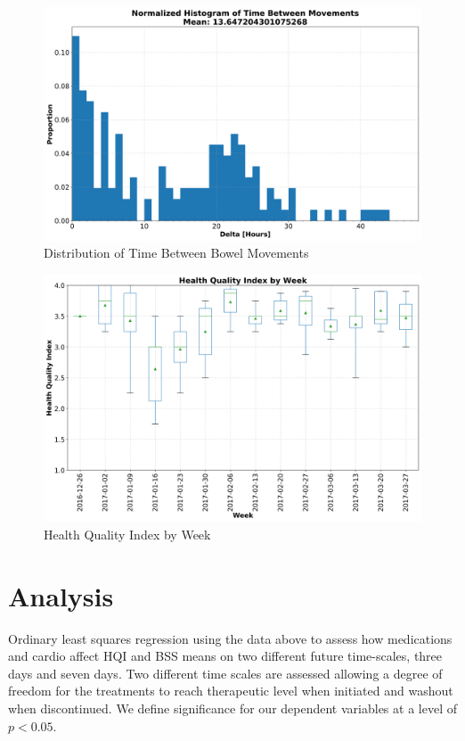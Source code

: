\documentclass[conference]{IEEEtran}
\begin{document}
\begin{figure}[t]
    \centering
    \includegraphics[width=\columnwidth]{time_between_movements.png}
    \caption{Distribution of Time Between Bowel Movements}\label{fig:time_between_movements}
\end{figure}


\begin{figure}[t]
    \centering
    \includegraphics[width=\columnwidth]{hqi_box.png}
    \caption{Health Quality Index by Week}\label{fig:hqi}
\end{figure}



\section{Analysis}

Ordinary least squares regression using the data above to assess how medications and cardio affect HQI and BSS means on two different future time-scales, three days and seven days.  Two different time scales are assessed allowing a degree of freedom for the treatments to reach therapeutic level when initiated and washout when discontinued.  We define significance for our dependent variables at a level of $p<0.05$.
\end{document}
